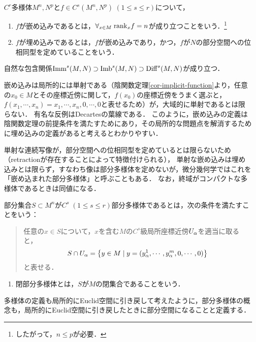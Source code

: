 \documentclass[uplatex,dvipdfmx]{jsreport}
\begin{document}
\begin{definition}
    $C^r$多様体$M^n,N^p$と$f\in C^s(M^n,N^p)\;(1\le s\le r)$について，
    \begin{enumerate}
        \item $f$が嵌め込みであるとは，$\forall_{x\in M}\;\mathrm{rank}_xf=n$が成り立つことをいう．\footnote{したがって，$n\le p$が必要．}
        \item $f$が埋め込みであるとは，$f$が嵌め込みであり，かつ，$f$が$N$の部分空間への位相同型を定めていることをいう．
    \end{enumerate}
    自然な包含関係$\mathrm{Imm}^s(M,N)\supset\mathrm{Imb}^s(M,N)\supset\mathrm{Diff}^s(M,N)$が成り立つ．
\end{definition}
\begin{remarks}
    嵌め込みは局所的には単射である（陰関数定理\ref{cor-implicit-function}より，任意の$x_0\in M$とその座標近傍に関して，$f(x_0)$の座標近傍をうまく選ぶと，$f(x_1,\cdots,x_n)=x_1,\cdots,x_n,0,\cdots,0$と表せるため）が，大域的に単射であるとは限らない．
    有名な反例はDecartesの葉線である．
    このように，嵌め込みの定義は陰関数定理の前提条件を満たすためにあり，その局所的な問題点を解消するために埋め込みの定義があると考えるとわかりやすい．
\end{remarks}
\begin{remark}
    単射な連続写像が，部分空間への位相同型を定めているとは限らないため（retractionが存在することによって特徴付けられる），
    単射な嵌め込みは埋め込みとは限らず，すなわち像は部分多様体を定めないが，微分幾何学ではこれを「嵌め込まれた部分多様体」と呼ぶこともある．
    なお，終域がコンパクトな多様体であるときは同値になる．
\end{remark}

\begin{definition}[部分多様体]
    部分集合$S\subset M^n$が$C^s\;(1\le s\le r)$部分多様体であるとは，次の条件を満たすことをいう：
    \begin{quote}
        任意の$x\in S$について，$x$を含む$M$の$C^s$級局所座標近傍$U_\alpha$を適当に取ると，
        \[S\cap U_\alpha=\left\{y\in M\mid y=(y^1_\alpha,\cdots,y^m_\alpha,0,\cdots,0)\right\}\]
        と表せる．
    \end{quote}
    \begin{enumerate}
        \item 閉部分多様体とは，$S$が$M$の閉集合であることをいう．
    \end{enumerate}
\end{definition}
\begin{remarks}
    多様体の定義も局所的にEuclid空間に引き戻して考えたように，部分多様体の概念も，局所的にEuclid空間に引き戻したときに部分空間になることと定義する．
\end{remarks}
\end{document}
